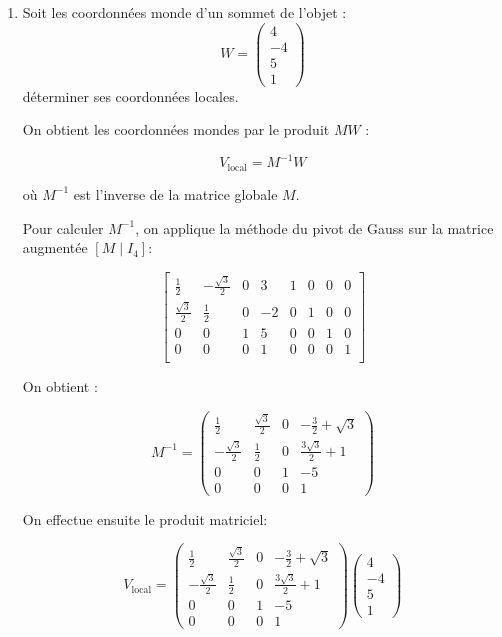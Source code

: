 \documentclass[a4paper,12pt]{article}
\begin{document}
\begin{enumerate}
  \item Soit les coordonnées monde d'un sommet de l'objet :  
  \[
  W = \begin{pmatrix} 4 \\ -4 \\ 5 \\ 1 \end{pmatrix}
  \]
  déterminer ses coordonnées locales. \newline

    On obtient les coordonnées mondes par le produit $M W$ :

      \[
      V_{\text{local}} = M^{-1} W
      \]

    où $M^{-1}$ est l'inverse de la matrice globale $M$. \newline

    Pour calculer $M^{-1}$, on applique la méthode du pivot de Gauss sur la matrice augmentée $[M \mid I_4]$:

      \[
      \left[
      \begin{array}{cccc|cccc}
      \frac{1}{2} & -\frac{\sqrt{3}}{2} & 0 & 3 & 1 & 0 & 0 & 0 \\
      \frac{\sqrt{3}}{2} & \frac{1}{2} & 0 & -2 & 0 & 1 & 0 & 0 \\
      0 & 0 & 1 & 5 & 0 & 0 & 1 & 0 \\
      0 & 0 & 0 & 1 & 0 & 0 & 0 & 1 \\
      \end{array}
      \right]
      \]

    On obtient :

      \[
      M^{-1} =
      \begin{pmatrix}
      \frac{1}{2} & \frac{\sqrt{3}}{2} & 0 & -\frac{3}{2} + \sqrt{3} \\
      -\frac{\sqrt{3}}{2} & \frac{1}{2} & 0 & \frac{3\sqrt{3}}{2} + 1 \\
      0 & 0 & 1 & -5 \\
      0 & 0 & 0 & 1
      \end{pmatrix}
      \] \newline

    On effectue ensuite le produit matriciel:

      \[
      V_{\text{local}} = 
      \begin{pmatrix}
      \frac{1}{2} & \frac{\sqrt{3}}{2} & 0 & -\frac{3}{2} + \sqrt{3} \\
      -\frac{\sqrt{3}}{2} & \frac{1}{2} & 0 & \frac{3\sqrt{3}}{2} + 1 \\
      0 & 0 & 1 & -5 \\
      0 & 0 & 0 & 1
      \end{pmatrix}
      \begin{pmatrix}
      4 \\ -4 \\ 5 \\ 1
      \end{pmatrix}
      \]


\end{enumerate}
\end{document}
